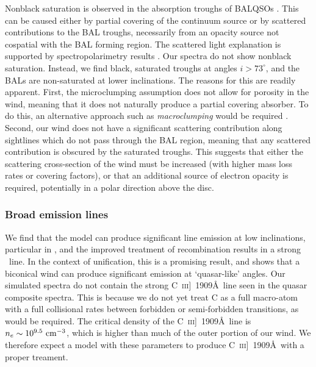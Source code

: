 \documentclass[preprint, a4paper, 11pt]{aastex}
\begin{document}
Nonblack saturation is observed in the absorption troughs of BALQSOs \citep{arav1999a,arav1999b}.
This can be caused either by partial covering of the continuum
source or by scattered contributions to the BAL troughs, necessarily
from an opacity source not cospatial with the BAL forming region.
The scattered light explanation is supported by spectropolarimetry results
\citep{lamy2000}. Our spectra do not show nonblack saturation.
Instead, we find black, saturated troughs at angles $i > 73^\circ$, and the BALs
are non-saturated at lower inclinations. The reasons for this are readily apparent. 
First, the microclumping assumption does not allow for 
porosity in the wind, meaning that it does not naturally produce
a partial covering absorber. To do this, an alternative approach
such as {\em macroclumping} would be required \citep[e.g.][]{surlan2012,hamann2008}.
Second, our wind does not have a significant scattering 
contribution along sightlines which do not pass through the BAL region,
meaning that any scattered contribution is obscured by the saturated troughs.
This suggests that either the scattering cross-section of the wind must
be increased (with higher mass loss rates or covering factors), or 
that an additional source of electron opacity is required, potentially
in a polar direction above the disc.


\subsubsection{Broad emission lines}

We find that the model can produce significant line emission
at low inclinations, particular in \civ, 
and the improved treatment of recombination results in a strong \la\
line. In the context of unification, this is a promising result, 
and shows that a biconical wind can produce significant 
emission at `quasar-like' angles. 
Our simulated spectra do not contain the strong C~\textsc{iii}]~1909\AA\, 
line seen in the quasar composite spectra. This is because we do not yet
treat C as a full macro-atom with a full collisional rates between forbidden
or semi-forbidden transitions, as would be required.
The critical density of the C~\textsc{iii}]~1909\AA\, line 
is $n_e\sim10^{9.5}~\rm{cm^{-3}}$, which is higher than much of the 
outer portion of our wind. We therefore expect a model with these 
parameters to produce C~\textsc{iii}]~1909\AA\ with a proper treament. 
\end{document}
